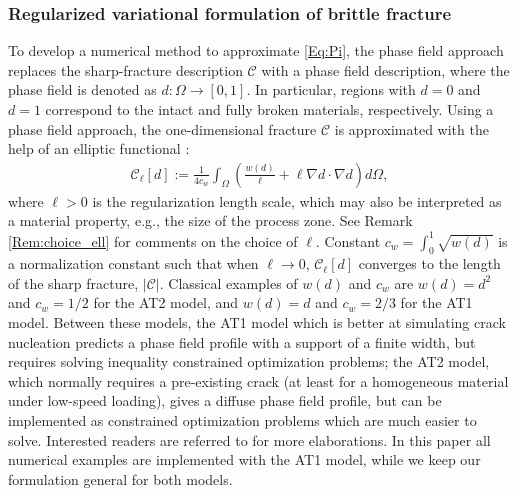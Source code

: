 \subsubsection{Regularized variational formulation of brittle fracture}
To develop a numerical method to approximate \eqref{Eq:Pi}, {the phase field approach replaces} the sharp-fracture description $\mathcal{C}$ with a phase field description, where the phase field is denoted as  $d:\Omega\rightarrow[0,1]$. In particular, regions with $d = 0$ and $d = 1$ correspond to the intact and fully broken materials, respectively. Using a phase field approach, the one-dimensional fracture $\mathcal{C}$ is approximated with the help of an elliptic %
functional \cite{ambrosio1990approximation, ambrosio1992approximation}:
\begin{equation}\label{Eq:Gamma_ell}
    \begin{aligned}
    \mathcal{C}_\ell[d]:=\frac{1}{4c_w}\int_\Omega\left(\frac{w(d)}{\ell} + \ell \nabla d\cdot\nabla d\right) d\Omega,  
    \end{aligned}
\end{equation}
where $\ell>0$ is the regularization length scale, which may also be interpreted as a material property, e.g., the size of the process zone. See Remark \ref{Rem:choice_ell} for comments on the choice of $\ell$. Constant $c_w=\int_{0}^{1} \sqrt{w(d)}$ is a normalization constant such that when $\ell\rightarrow 0$, {$\mathcal{C}_\ell[d]$} converges to the {length of the} sharp fracture{, $|\mathcal{C}|$}. Classical examples of $w(d)$ and $c_{w}$ are $w(d)=d^2$ and $c_{w}=1/2$ for the AT2 model, and $w(d)=d$ and $c_{w}=2/3$ for the AT1 model. {Between these models, the AT1 model which is better at simulating crack nucleation \cite{tanne2018crack} predicts a phase field profile with a support of a finite width, but requires solving inequality constrained optimization problems; the AT2 model, which normally requires a pre-existing crack (at least for a homogeneous material under low-speed loading), gives a diffuse phase field profile, but can be implemented as constrained optimization problems which are much easier to solve.} Interested readers are referred to \cite{tanne2018crack,Bourdin2014014301} %
for more elaborations. {In this paper all numerical examples are implemented with the AT1 model, while we keep our formulation general for both models.}

